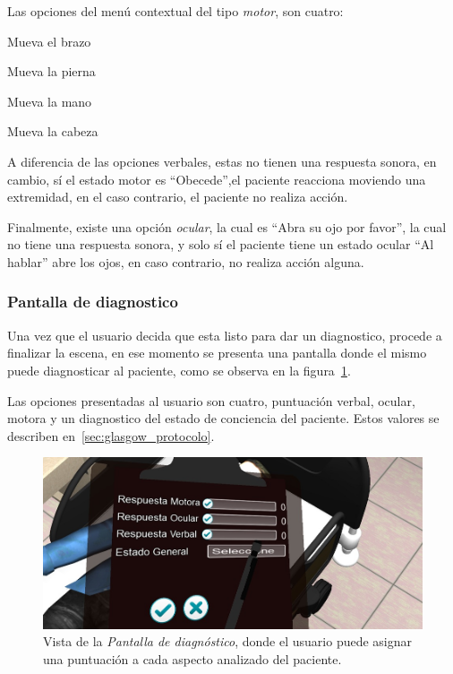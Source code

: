 Las opciones del menú contextual del tipo \emph{motor}, son cuatro: 

\begin{itemize*}
    \item Mueva el brazo
    \item Mueva la pierna
    \item Mueva la mano
    \item Mueva la cabeza
\end{itemize*}

A diferencia de las opciones verbales, estas no tienen una respuesta sonora, en
cambio, sí el estado motor es \enquote{Obecede},el paciente reacciona moviendo
una extremidad, en el caso contrario, el paciente no realiza acción.

Finalmente, existe una opción \emph{ocular}, la cual es \enquote{Abra su ojo por
favor}, la cual no tiene una respuesta sonora, y solo sí el paciente tiene un
estado ocular \enquote{Al hablar} abre los ojos, en caso contrario, no realiza
acción alguna.

\subsubsection{Pantalla de diagnostico}

Una vez que el usuario decida que esta listo para dar un diagnostico, procede a
finalizar la escena, en ese momento se presenta una pantalla donde el mismo
puede diagnosticar al paciente, como se observa en la
figura~\ref{fig:glasgow_gui_resultados}.

Las opciones presentadas al usuario son cuatro, puntuación verbal, ocular,
motora y un diagnostico del estado de conciencia del paciente. Estos valores
se describen en~\ref{sec:glasgow_protocolo}.

\begin{figure}[H]
\centering
\includegraphics[scale=0.5]{propuesta/glasgow_diagnostico.jpg}
\caption{Vista de la \emph{Pantalla de diagnóstico}, donde el usuario puede
    asignar una puntuación a cada aspecto analizado del paciente.}
\label{fig:glasgow_gui_resultados}
\end{figure}

